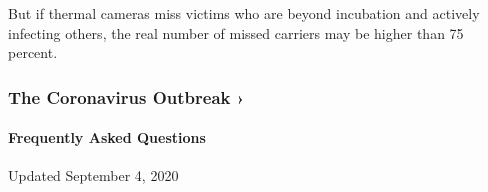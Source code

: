 But if thermal cameras miss victims who are beyond incubation and
actively infecting others, the real number of missed carriers may be
higher than 75 percent.

\href{https://www.nytimes3xbfgragh.onion/news-event/coronavirus?action=click\&pgtype=Article\&state=default\&region=MAIN_CONTENT_3\&context=storylines_faq}{}

\hypertarget{the-coronavirus-outbreak-}{%
\subsubsection{The Coronavirus Outbreak
›}\label{the-coronavirus-outbreak-}}

\hypertarget{frequently-asked-questions}{%
\paragraph{Frequently Asked
Questions}\label{frequently-asked-questions}}

Updated September 4, 2020

